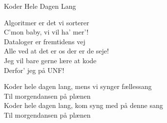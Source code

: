 \begin{song}{Koder Hele Dagen Lang}
  \begin{SBVerse}
    Algoritmer er det vi sorterer \\
    C’mon baby, vi vil ha’ mer’! \\
    Dataloger er fremtidens vej \\
    Alle ved at det er os der er de seje! \\
    Jeg vil bare gerne lære at kode \\
    Derfor’ jeg på UNF! \\
  \end{SBVerse}

  \begin{SBChorus}
    Koder hele dagen lang, mens vi synger fællessang \\
    Til morgendansen på plænen \\
    Koder hele dagen lang, kom syng med på denne sang \\
    Til morgendansen på plænen \\
  \end{SBChorus}
\end{song}